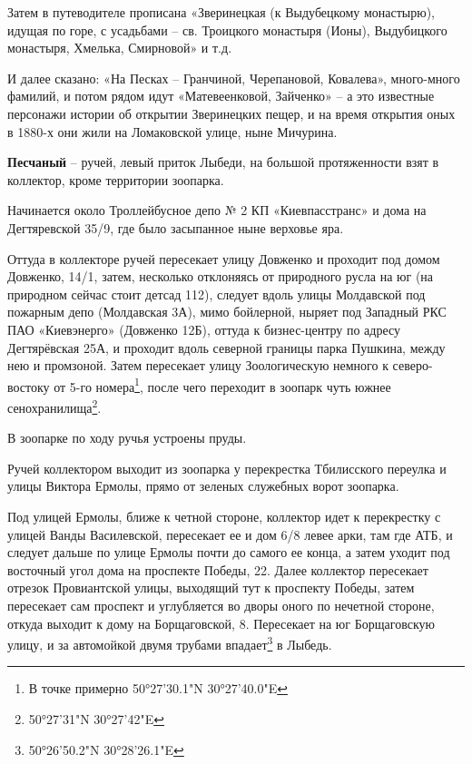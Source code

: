 Затем в путеводителе прописана «Зверинецкая (к Выдубецкому монастырю), идущая по горе, с усадьбами – св. Троицкого монастыря (Ионы), Выдубицкого монастыря, Хмелька, Смирновой» и т.д.

И далее сказано: «На Песках – Гранчиной, Черепановой, Ковалева», много-много фамилий, и потом рядом идут «Матевеенковой, Зайченко» – а это известные персонажи истории об открытии Зверинецких пещер, и на время открытия оных в 1880-х они жили на Ломаковской улице, ныне Мичурина.\\

\medskip

\textbf{Песчаный} – ручей, левый приток Лыбеди, на большой протяженности взят в коллектор, кроме территории зоопарка.

Начинается около Троллейбусное депо № 2 КП «Киевпасстранс» и дома на Дегтяревской 35/9, где было засыпанное ныне верховье яра. 

Оттуда в коллекторе ручей пересекает улицу Довженко и проходит под домом Довженко, 14/1, затем, несколько отклоняясь от природного русла на юг (на природном сейчас стоит детсад 112), следует вдоль улицы Молдавской под пожарным депо (Молдавская 3А), мимо  бойлерной, ныряет под Западный РКС ПАО «Киевэнерго» (Довженко 12Б), оттуда к бизнес-центру по адресу Дегтярёвская 25А, и проходит вдоль северной границы парка Пушкина, между нею и промзоной. Затем пересекает улицу Зоологическую немного к северо-востоку от 5-го номера\footnote{В точке примерно 50°27'30.1"N 30°27'40.0"E}, после чего переходит в зоопарк чуть южнее сенохранилища\footnote{50°27'31"N 30°27'42"E}.

В зоопарке по ходу ручья устроены пруды.

Ручей коллектором выходит из зоопарка у перекрестка Тбилисского переулка и улицы Виктора Ермолы, прямо от зеленых служебных ворот зоопарка.

Под улицей Ермолы, ближе к четной стороне, коллектор идет к перекрестку с улицей Ванды Василевской, пересекает ее и дом 6/8 левее арки, там где АТБ, и следует дальше по улице Ермолы почти до самого ее конца, а затем уходит под восточный угол дома на проспекте Победы, 22. Далее коллектор пересекает отрезок Провиантской улицы, выходящий тут к проспекту Победы, затем пересекает сам проспект и углубляется во дворы оного по нечетной стороне, откуда выходит к дому на Борщаговской, 8. Пересекает на юг Борщаговскую улицу, и за автомойкой двумя трубами впадает\footnote{50°26'50.2"N 30°28'26.1"E} в Лыбедь.\\

